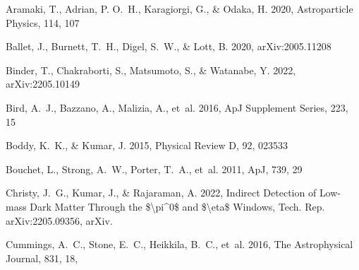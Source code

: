 \begin{thebibliography}{99}
Aramaki, T., Adrian, P. O.~H., Karagiorgi, G., \& Odaka, H. 2020, Astroparticle Physics, 114, 107%

Ballet, J., Burnett, T.~H., Digel, S.~W., \& Lott, B. 2020, arXiv:2005.11208

Binder, T., Chakraborti, S., Matsumoto, S., \& Watanabe, Y. 2022, 
arXiv:2205.10149

Bird, A.~J., Bazzano, A., Malizia, A., {et~al.} 2016, ApJ
  Supplement Series, 223, 15%

Boddy, K.~K., \& Kumar, J. 2015, Physical Review D, 92, 023533%

Bouchet, L., Strong, A.~W., Porter, T.~A., {et~al.} 2011, ApJ, 739, 29%

Christy, J.~G., Kumar, J., \& Rajaraman, A. 2022, Indirect {Detection} of
  {Low}-mass {Dark} {Matter} {Through} the
  \${\textbackslash}pi{\textasciicircum}0\$ and \${\textbackslash}eta\$
  {Windows}, Tech. Rep. arXiv:2205.09356, arXiv.


Cummings, A.~C., Stone, E.~C., Heikkila, B.~C., {et~al.} 2016, The
  Astrophysical Journal, 831, 18, 


\end{thebibliography}
